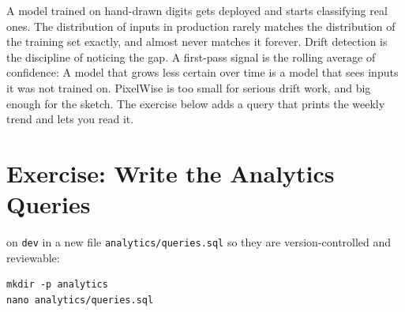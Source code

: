 A model trained on hand-drawn digits gets deployed and starts
classifying real ones. The distribution of inputs in production rarely
matches the distribution of the training set exactly, and almost never
matches it forever. Drift detection is the discipline of noticing the
gap. A first-pass signal is the rolling average of confidence: A model
that grows less certain over time is a model that sees inputs it was
not trained on. PixelWise is too small for serious drift work, and big
enough for the sketch. The exercise below adds a query that prints the
weekly trend and lets you read it.




\newpage
\section{Exercise: Write the Analytics Queries}

 on \texttt{dev} in a new file
\texttt{analytics/queries.sql} so they are version-controlled and
reviewable:

\begin{verbatim}
mkdir -p analytics
nano analytics/queries.sql
\end{verbatim}


